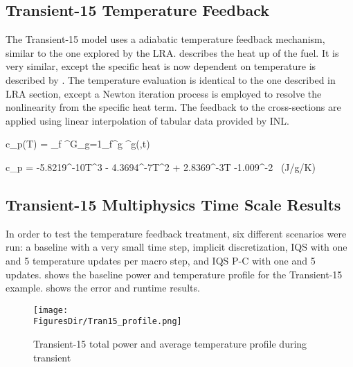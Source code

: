 \subsection{Transient-15 Temperature Feedback}

The Transient-15 model uses a adiabatic temperature feedback mechanism, similar to the one explored by the LRA.  describes the heat up of the fuel.  It is very similar, except the specific heat is now dependent on temperature is described by .  The temperature evaluation is identical to the one described in LRA section, except a Newton iteration process is employed to resolve the nonlinearity from the specific heat term.  The feedback to the cross-sections are applied using linear interpolation of tabular data provided by INL.

\be
\rho c_p(T)  = \kappa_f \sum^G_{g=1}\Sigma_f^g \phi^g(,t)
\label{eq:temp2}
\ee

\be
c_p = -5.8219^{-10}T^3 - 4.3694^{-7}T^2 + 2.8369^{-3}T -1.009^{-2} \ (J/g/K)
\label{eq:cp}
\ee

\subsection{Transient-15 Multiphysics Time Scale Results}

In order to test the temperature feedback treatment, six different scenarios were run: a baseline with a very small time step, implicit discretization, IQS with one and 5 temperature updates per macro step, and IQS P-C with one and 5 updates.   shows the baseline power and temperature profile for the Transient-15 example.   shows the error and runtime results.

\begin{figure}[htbp!]
\centering
\texttt{[image: \\FiguresDir/Tran15\_profile.png]}
\caption{Transient-15 total power and average temperature profile during transient}
\label{fig:Tran15_profile}
\end{figure}

